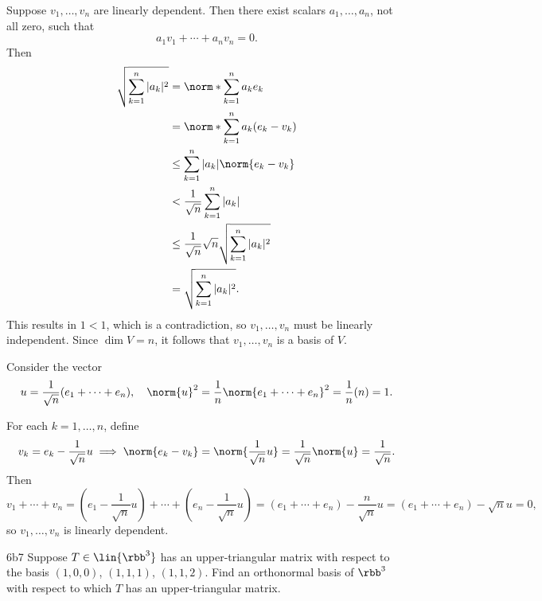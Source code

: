 \begin{solenum}
    \item Suppose $v_1, \ldots, v_n$ are linearly dependent.
    Then there exist scalars $a_1, \ldots, a_n$, not all zero, such that
    \[
        a_1 v_1 + \cdots + a_n v_n = 0.
    \]
    Then
    \begin{align*}
        \sqrt{\sum_{k=1}^n|a_k|^2} &= \norm*{\sum_{k=1}^n a_k e_k} \\
        &= \norm*{\sum_{k=1}^na_k(e_k - v_k)} \\
        &\leq \sum_{k=1}^n |a_k|\norm{e_k - v_k} \\
        &< \frac{1}{\sqrt{n}}\sum_{k=1}^n |a_k| \\
        &\leq \frac{1}{\sqrt{n}}\sqrt{n}\sqrt{\sum_{k=1}^n|a_k|^2} \\
        &= \sqrt{\sum_{k=1}^n|a_k|^2}.
    \end{align*}
    This results in $1 < 1$, which is a contradiction, so $v_1, \ldots, v_n$ must be linearly independent.
    Since $\dim V = n$, it follows that $v_1, \ldots, v_n$ is a basis of $V$.
    \item Consider the vector
    \[
        u = \frac{1}{\sqrt{n}}(e_1 + \cdots + e_n), \quad \norm{u}^2 = \frac{1}{n}\norm{e_1 + \cdots + e_n}^2 = \frac{1}{n}(n) = 1.
    \]
    
    For each $k = 1, \ldots, n$, define
    \[
        v_k = e_k - \frac{1}{\sqrt{n}}u \implies \norm{e_k - v_k} = \norm{\frac{1}{\sqrt{n}}u} = \frac{1}{\sqrt{n}}\norm{u} = \frac{1}{\sqrt{n}}.
    \]
    Then
    \[
        v_1 + \cdots + v_n = (e_1 - \frac{1}{\sqrt{n}}u) + \cdots + (e_n - \frac{1}{\sqrt{n}}u) = (e_1 + \cdots + e_n) - \frac{n}{\sqrt{n}}u = (e_1 + \cdots + e_n) - \sqrt{n}u = 0,
    \]
    so $v_1, \ldots, v_n$ is linearly dependent.
\end{solenum}

\begin{exercise}{6b7}
    Suppose $T \in \lin{\rbb^3}$ has an upper-triangular matrix with respect to the basis $(1, 0, 0)$, $(1, 1, 1)$, $(1, 1, 2)$.
    Find an orthonormal basis of $\rbb^3$ with respect to which $T$ has an upper-triangular matrix.
\end{exercise}

